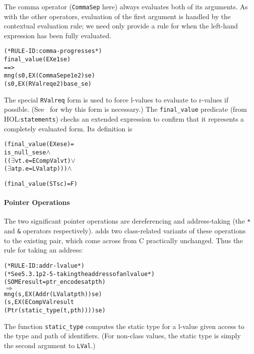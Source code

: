 \documentclass[11pt]{article}
\newcommand{\HOLfile}[1]{HOL:\texttt{#1}}
\begin{document}
\medskip
\noindent
{}%
The comma operator (\texttt{CommaSep} here) always evaluates both of
its arguments.  As with the other operators, evaluation of the first
argument is handled by the contextual evaluation rule; we need only
provide a rule for when the left-hand expression has been fully
evaluated.
%
\begin{alltt}
(* RULE-ID: comma-progresses *)
     final_value (EX e1 se)
   ==>
     mng (s0, EX (CommaSep e1 e2) se)
         (s0, EX (RValreq e2) base_se)
\end{alltt}
%
The special \texttt{RValreq} form is used to force l-values to
evaluate to r-values if possible.  (See~\cite[\S3.3.3]{Norrish98} for
why this form is necessary.)
%
The \texttt{final_value} predicate (from \HOLfile{statements}) checks
an extended expression to confirm that it represents a completely
evaluated form.  Its definition is
\begin{center}
\begin{minipage}{\textwidth}
\begin{alltt}
   (final_value (EX e se) =
      is_null_se se \(\land\)
      ((\(\exists\)v t. e = ECompVal v t) \(\lor\)
       (\(\exists\)a t p. e = LVal a t p))) \(\land\)

   (final_value (ST s c) = F)
\end{alltt}
\end{minipage}
\end{center}

\paragraph{Pointer Operations}
The two significant pointer operations are dereferencing and
address-taking (the \texttt{*} and \texttt{\&} operators
respectively).  \cpp{} adds two class-related variants of these
operations to the existing pair, which come across from C practically
unchanged.  Thus the rule for taking an address:
%
\begin{alltt}
(* RULE-ID: addr-lvalue *)
(* See 5.3.1 p2-5 - taking the address of an lvalue *)
     (SOME result = ptr_encode s a t pth)
   \(\Rightarrow\)
     mng (s, EX (Addr (LVal a t pth)) se)
         (s, EX (ECompVal result
                          (Ptr (static_type (t,pth)))) se)

\end{alltt}
%
The function
\texttt{static_type} computes
the static type for a l-value given access to the type and path of
identifiers.  (For non-class values, the static type is simply the
second argument to \texttt{LVal}.)
\end{document}
